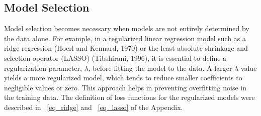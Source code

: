 \subsection{Model Selection}

Model selection becomes necessary when models are not entirely determined by the data alone. For example, in a regularized linear regression model such as a ridge regression (Hoerl and Kennard, 1970) or the least absolute shrinkage and selection operator (LASSO) (Tibshirani, 1996),  it is essential to define a regularization parameter, $\lambda$, before fitting the model to the data. A larger $\lambda$ value yields a more regularized model, which tends to reduce smaller coefficients to negligible values or zero. This approach helps in preventing overfitting noise in the training data. The definition of loss functions for the regularized models were described in ~\ref{eq_ridge} and ~\ref{eq_lasso} of the Appendix.

